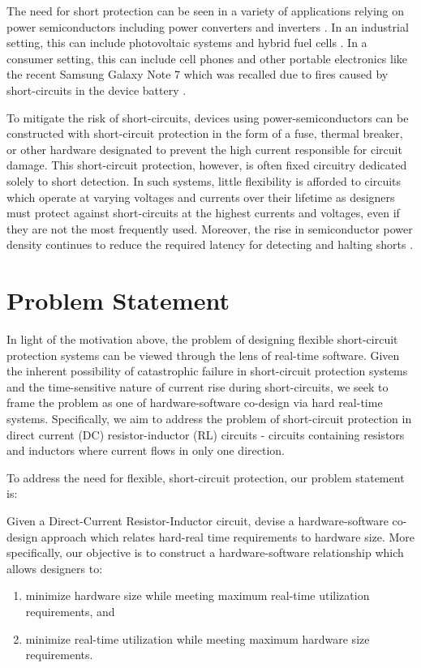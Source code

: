 \documentclass[11pt,oneside]{report}
\begin{document}
    The need for short protection can be seen in a variety of applications relying on power semiconductors including power converters and inverters \cite{hiSpeedProtection}.
    In an industrial setting, this can include photovoltaic systems and hybrid fuel cells \cite{photoVoltaic}. 
    In a consumer setting, this can include cell phones and other portable electronics like the recent Samsung Galaxy Note 7 which was recalled due to fires caused by short-circuits in the device battery \cite{explodingPhone}.
    
    To mitigate the risk of short-circuits, devices using power-semiconductors can be constructed with short-circuit protection in the form of a fuse, thermal breaker, or other hardware designated to prevent the high current responsible for circuit damage. 
    This short-circuit protection, however, is often fixed circuitry dedicated solely to short detection. In such systems, little flexibility is afforded to circuits which operate at varying voltages and currents over their lifetime as designers must protect against short-circuits at the highest currents and voltages, even if they are not the most frequently used. Moreover, the rise in semiconductor power density continues to reduce the required latency for detecting and halting shorts \cite{gateChargeChara}.
    
    \section{Problem Statement}
    In light of the motivation above, the problem of designing flexible short-circuit protection systems can be viewed through the lens of real-time software.
    Given the inherent possibility of catastrophic failure in short-circuit protection systems and the time-sensitive nature of current rise during short-circuits, we seek to frame the problem as one of hardware-software co-design via hard real-time systems.
    Specifically, we aim to address the problem of short-circuit protection in direct current (DC) resistor-inductor (RL) circuits - circuits containing resistors and inductors where current flows in only one direction.
    
    To address the need for flexible, short-circuit protection, our problem statement is:
    
    \noindent Given a Direct-Current Resistor-Inductor circuit, devise a hardware-software co-design approach which relates hard-real time requirements to hardware size. More specifically, our objective is to construct a hardware-software relationship which allows designers to:
    \begin{enumerate}
        \item minimize hardware size while meeting maximum real-time utilization requirements, and
        \item minimize real-time utilization while meeting maximum hardware size requirements.
    \end{enumerate}
    
\end{document}
